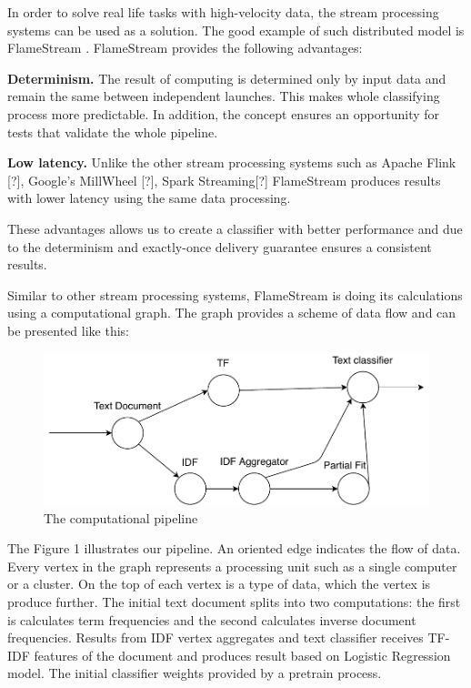 

In order to solve real life tasks with high-velocity data, the stream processing systems can be used as a solution. The good example of such distributed model is FlameStream \cite{Kuralenok:2018}. FlameStream provides the following advantages:

\textbf{Determinism.} The result of computing is determined only by input data and remain the same between independent launches. This makes whole classifying process more predictable. In addition, the concept ensures an opportunity for tests that validate the whole pipeline.

\textbf{Low latency.} Unlike the other stream processing systems such as Apache Flink [?], Google's MillWheel [?], Spark Streaming[?] FlameStream produces results with lower latency using the same data processing.

These advantages allows us to create a classifier with better performance and due to the determinism and exactly-once delivery guarantee ensures a consistent results.

Similar to other stream processing systems, FlameStream is doing its calculations using a computational graph. The graph provides a scheme of data flow and can be presented like this:

\begin{figure}[htbp]
  \centering
  \includegraphics[scale=0.5]{pics/tf-idf-graph}
  \caption{The computational pipeline}
  \label {TF-IDF Graph}
\end{figure}

The Figure 1 illustrates our pipeline. An oriented edge indicates the flow of data. Every vertex in the graph represents a processing unit such as a single computer or a cluster. On the top of each vertex is a type of data, which the vertex is produce further. The initial text document splits into two computations: the first is calculates term frequencies and the second calculates inverse document frequencies. Results from IDF vertex aggregates and text classifier receives TF-IDF features of the document and produces result based on Logistic Regression model. The initial classifier weights provided by a pretrain process.

